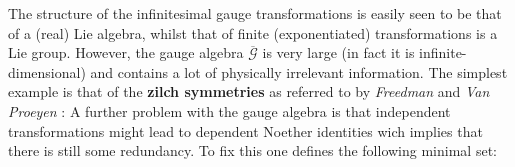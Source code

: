    The structure of the infinitesimal gauge transformations is easily seen to be that of a (real) Lie algebra, whilst that of finite (exponentiated) transformations is a Lie group. However, the gauge algebra $\overline{\mathcal{G}}$ is very large (in fact it is infinite-dimensional) and contains a lot of physically irrelevant information. The simplest example is that of the \textbf{zilch symmetries} as referred to by \textit{Freedman} and \textit{Van Proeyen} \cite{supergravity}:
    A further problem with the gauge algebra is that independent transformations might lead to dependent Noether identities wich implies that there is still some redundancy. To fix this one defines the following minimal set:
